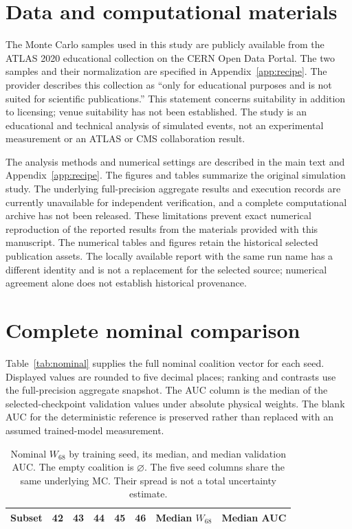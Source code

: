 \documentclass[aps,prd,reprint,superscriptaddress,nofootinbib,longbibliography,floatfix]{revtex4-2}
\let\label\OriginalLaTeXLabel
\newcommand{\W}{W_{68}}
\begin{document}
\begin{acknowledgments}
\end{acknowledgments}

\section*{Data and computational materials}
The Monte Carlo samples used in this study are publicly available from the
ATLAS 2020 educational collection on the CERN Open Data
Portal\cite{ATLAS2020}. The two samples and their normalization are specified
in Appendix~\ref{app:recipe}. The provider describes this collection as
``only for educational purposes and is not suited for scientific
publications.'' This statement concerns suitability in addition to
licensing; venue suitability has not been established. The study is an
educational and technical analysis of simulated events, not an experimental
measurement or an ATLAS or CMS collaboration result.

The analysis methods and numerical settings are described in the main text
and Appendix~\ref{app:recipe}. The figures and tables summarize the original
simulation study. The underlying full-precision aggregate results and
execution records are currently unavailable for independent verification,
and a complete computational archive has not been released. These limitations
prevent exact numerical reproduction of the reported results from the
materials provided with this manuscript.
The numerical tables and figures retain the historical selected publication
assets. The locally available report with the same run name has a different
identity and is not a replacement for the selected source; numerical
agreement alone does not establish historical provenance.

\clearpage
\onecolumngrid
\appendix
\section{Complete nominal comparison}
\label{app:nominal}
Table~\ref{tab:nominal} supplies the full nominal coalition vector for each
seed. Displayed values are rounded to five decimal places; ranking and
contrasts use the full-precision aggregate snapshot. The AUC column is the
median of the selected-checkpoint validation values under absolute physical
weights. The blank AUC for the deterministic reference is preserved rather
than replaced with an assumed trained-model measurement.

\begin{table}[!h]
\caption{Nominal $\W$ by training seed, its median, and median validation AUC.
The empty coalition is $\varnothing$. The five seed columns share the same
underlying MC. Their spread is not a total uncertainty estimate.}
\label{tab:nominal}
\small
\centering
\begin{ruledtabular}
\begin{tabular}{lrrrrrrr}
Subset & 42 & 43 & 44 & 45 & 46 & Median $\W$ & Median AUC \\
\hline

\end{tabular}
\end{ruledtabular}
\end{table}
\end{document}
